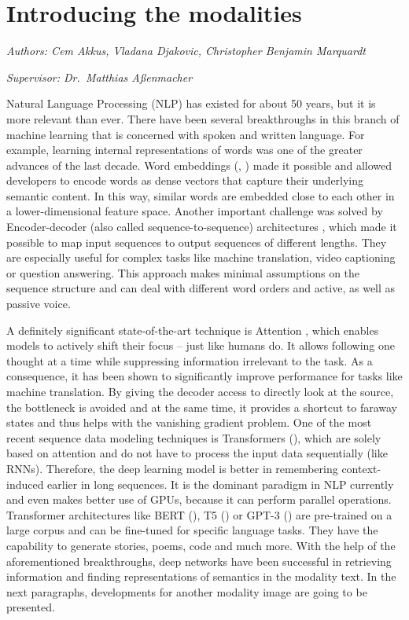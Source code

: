 \documentclass[
]{krantz}
\begin{document}
\hypertarget{introducing-the-modalities}{%
\chapter{Introducing the modalities}\label{introducing-the-modalities}}

\emph{Authors: Cem Akkus, Vladana Djakovic, Christopher Benjamin Marquardt}

\emph{Supervisor: Dr.~Matthias Aßenmacher}

Natural Language Processing (NLP) has existed for about 50 years, but it is more relevant than ever. There have been several breakthroughs in this branch of machine learning that is concerned with spoken and written language. For example, learning internal representations of words was one of the greater advances of the last decade. Word embeddings (\citet{Mikolov2013}, \citet{Bojanowski2016}) made it possible and allowed developers to encode words as dense vectors that capture their underlying semantic content. In this way, similar words are embedded close to each other in a lower-dimensional feature space. Another important challenge was solved by Encoder-decoder (also called sequence-to-sequence) architectures \citet{Sutskever2014}, which made it possible to map input sequences to output sequences of different lengths. They are especially useful for complex tasks like machine translation, video captioning or question answering. This approach makes minimal assumptions on the sequence structure and can deal with different word orders and active, as well as passive voice.

A definitely significant state-of-the-art technique is Attention \citet{Bahdanau2014}, which enables models to actively shift their focus -- just like humans do. It allows following one thought at a time while suppressing information irrelevant to the task. As a consequence, it has been shown to significantly improve performance for tasks like machine translation. By giving the decoder access to directly look at the source, the bottleneck is avoided and at the same time, it provides a shortcut to faraway states and thus helps with the vanishing gradient problem. One of the most recent sequence data modeling techniques is Transformers (\citet{vaswani2017attention}), which are solely based on attention and do not have to process the input data sequentially (like RNNs). Therefore, the deep learning model is better in remembering context-induced earlier in long sequences. It is the dominant paradigm in NLP currently and even makes better use of GPUs, because it can perform parallel operations. Transformer architectures like BERT (\citet{Devlin2018}), T5 (\citet{Raffel2019}) or GPT-3 (\citet{brown2020language}) are pre-trained on a large corpus and can be fine-tuned for specific language tasks. They have the capability to generate stories, poems, code and much more. With the help of the aforementioned breakthroughs, deep networks have been successful in retrieving information and finding representations of semantics in the modality text. In the next paragraphs, developments for another modality image are going to be presented.
\end{document}
